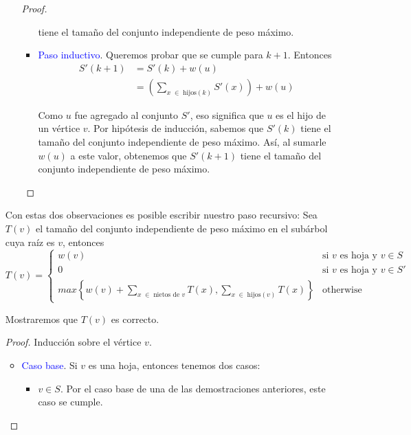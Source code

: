 \documentclass[letterpaper,11pt]{article}
\begin{document}
\begin{enumerate}
\begin{itemize}
\begin{proof}
\begin{itemize}
                tiene el tamaño del conjunto independiente de peso máximo. 

                \item \textcolor{blue}{Paso inductivo}. Queremos probar que se 
                cumple para $k+1$. Entonces 
                \begin{align*}
                    S'(k+1)
                    &= S'(k) + w(u) \\
                    &= \left(\sum_{x \; \in \; \text{hijos}(k)} S'(x)\right) 
                    + w(u)
                \end{align*}

                Como $u$ fue agregado al conjunto $S'$, eso significa que $u$ 
                es el hijo de un vértice $v$. Por hipótesis de inducción, 
                sabemos que $S'(k)$ tiene el tamaño del conjunto independiente de 
                peso máximo. Así, al sumarle $w(u)$ a este valor, obtenemos que 
                $S'(k+1)$ tiene el tamaño del conjunto independiente de peso 
                máximo.
            \end{itemize}
        \end{proof}
        
    \end{itemize} 

    Con estas dos observaciones es posible escribir nuestro paso recursivo: Sea 
    $T(v)$ el tamaño del conjunto independiente de peso máximo en el subárbol 
    cuya raíz es $v$, entonces 
    \begin{equation*}
        T(v) = 
        \begin{cases}
            w(v) & \text{si $v$ es hoja y $v \in S$} \\
            0 & \text{si $v$ es hoja y $v \in S'$} \\
            max \left\{w(v) + \sum_{x \; \in \; \text{nietos de $v$}} 
            T(x), \sum_{x \; \in \; \text{hijos}(v)} T(x)\right\} 
            & \text{otherwise}
        \end{cases}
    \end{equation*}

    Mostraremos que $T(v)$ es correcto.
    \begin{proof}
        Inducción sobre el vértice $v$. 
        \begin{itemize}
            \item \textcolor{blue}{Caso base}. Si $v$ es una hoja, entonces 
            tenemos dos casos:
            \begin{itemize}
                \item $v \in S$. Por el caso base de una de las demostraciones 
                anteriores, este caso se cumple.


\end{itemize}
\end{itemize}
\end{proof}
\end{enumerate}
\end{document}
